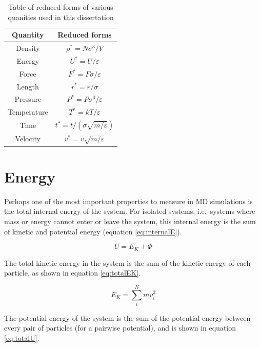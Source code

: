 \documentclass[12pt]{UoAthesis}
\begin{document}
\begin{table}[htp] 
  \caption{Table of reduced forms of various quanities used in this
    dissertation \cite{Haile1997}}
  \label{tab:reducedForms}
  \begin{center}
    \begin{tabular}{c c}
      \toprule
      Quantity & Reduced forms \\
      \midrule
      Density & $\rho^* = N \sigma^3 / V$ \\
      Energy & $U^* = U / \varepsilon$ \\
      Force & $F^* = F\sigma/\varepsilon$ \\
      Length & $r^* = r / \sigma$ \\
      Pressure & $P^* = P \sigma^3 /\varepsilon$ \\
      Temperature & $T^* = kT/\varepsilon$ \\
      Time & $t^* = t / (\sigma \sqrt{m/\varepsilon})$ \\
      Velocity & $v^* = v\sqrt{m/\varepsilon}$ \\
      \bottomrule
    \end{tabular}
  \end{center}
\end{table}

\section{Energy \label{sec:Energy}}
Perhaps one of the most important properties to measure in MD
simulations is the total internal energy of the system.  For isolated
systems, i.e.\ systems where mass or energy cannot enter or leave the
system, this internal energy is the sum of kinetic and potential
energy (equation \eqref{eq:internalE}).

\begin{equation}
  U = E_K + \Phi \label{eq:internalE}
\end{equation}

The total kinetic energy in the system is the sum of the kinetic
energy of each particle, as shown in equation \eqref{eq:totalEK}.

\begin{equation}
  \label{eq:totalEK}
  E_K = \sum_i^N mv_i^2
\end{equation}

The potential energy of the system is the sum of the potential energy
between every pair of particles (for a pairwise potential), and is
shown in equation \eqref{eq:totalU}.
\end{document}
